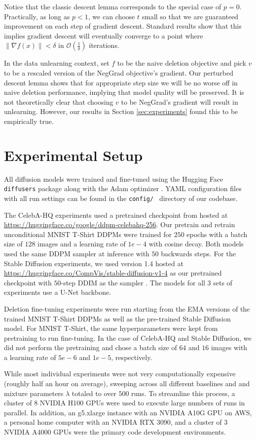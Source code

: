 \documentclass{article} \usepackage{iclr2025_conference,times}
\renewcommand{\cite}{\citep}
\begin{document}
Notice that the classic descent lemma corresponds to the special case of $p=0$. Practically, as long as $p<1$, we can choose $t$ small so that we are guaranteed improvement on each step of gradient descent. Standard results show that this implies gradient descent will eventually converge to a point where $\|\nabla f(x)\|<\delta$ in $\mathcal{O}(\frac{1}{\delta})$ iterations.

In the data unlearning context, set $f$ to be the naive deletion objective and pick $v$ to be a rescaled version of the NegGrad objective's gradient. Our perturbed descent lemma shows that for appropriate step size we will be no worse off in naive deletion performance, implying that model quality will be preserved. It is not theoretically clear that choosing $v$ to be NegGrad's gradient will result in unlearning. However, our results in Section \ref{sec:experiments} found this to be empirically true. 


\section{Experimental Setup}
\label{apndx:experimental_setup}
All diffusion models were trained and fine-tuned using the Hugging Face \texttt{diffusers} package along with the Adam optimizer \cite{kingma2015adam}. YAML configuration files with all run settings can be found in the \texttt{config/
} directory of our codebase. 

The CelebA-HQ experiments used a pretrained checkpoint from \citet{ho2020denoising} hosted at \url{https://huggingface.co/google/ddpm-celebahq-256}. Our pretrain and retrain unconditional MNIST T-Shirt DDPMs were trained for $250$ epochs with a batch size of $128$ images and a learning rate of $1e-4$ with cosine decay. Both models used the same DDPM sampler at inference with $50$ backwards steps. For the Stable Diffusion experiments, we used version 1.4 hosted at \url{https://huggingface.co/CompVis/stable-diffusion-v1-4} as our pretrained checkpoint with $50$-step DDIM as the sampler \cite{meng2021ddim}. The models for all $3$ sets of experiments use a U-Net backbone. 

Deletion fine-tuning experiments were run starting from the EMA versions of the trained MNIST T-Shirt DDPMs as well as the pre-trained Stable Diffusion model. For MNIST T-Shirt, the same hyperparameters were kept from pretraining to run fine-tuning. In the case of CelebA-HQ and Stable Diffusion, we did not perform the pretraining and chose a batch size of $64$ and $16$ images with a learning rate of $5e-6$ and $1e-5$, respectively.

While most individual experiments were not very computationally expensive (roughly half an hour on average), sweeping across all different baselines and and mixture parameters $\lambda$ totaled to over $500$ runs. To streamline this process, a cluster of $8$ NVIDIA H100 GPUs were used to execute large numbers of runs in parallel. In addition, an g5.xlarge instance with an NVIDIA A10G GPU on AWS, a personal home computer with an NVIDIA RTX 3090, and a cluster of $3$ NVIDIA A4000 GPUs were the primary code development environments. 
\end{document}
